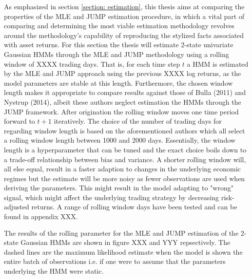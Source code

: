 As emphasized in section \ref{section: estimation}, this thesis aims at comparing the properties of the MLE and JUMP estimation procedure, in which a vital part of comparing and determining the most viable estimation methodology revolves around the methodology's capability of reproducing the stylized facts associated with asset returns. For this section the thesis will estimate 2-state univariate Gaussian HMMs through the MLE and JUMP methodology using a rolling window of XXXX trading days. That is, for each time step $t$ a HMM is estimated by the MLE and JUMP approach using the previous XXXX log returns, as the model parameters are stable at this length. Furthermore, the chosen window length makes it appropriate to compare results against those of Bulla (2011) and Nystrup (2014), albeit these authors neglect estimation the HMMs through the JUMP framework. After origination the rolling window moves one time period forward to $t+1$ iteratively. The choice of the number of trading days for regarding window length is based on the aforementioned authors which all select a rolling window length between 1000 and 2000 days. Essentially, the window length is a hyperparameter that can be tuned and the exact choice boils down to a trade-off relationship between bias and variance. A shorter rolling window will, all else equal, result in a faster adaption to changes in the underlying economic regimes but the estimate will be more noisy as fewer observations are used when deriving the parameters. This might result in the model adapting to "wrong" signal, which might affect the underlying trading strategy by decreasing risk-adjusted returns. A range of rolling window days have been tested and can be found in appendix XXX.

The results of the rolling parameter for the MLE and JUMP estimation of the 2-state Gaussian HMMs are shown in figure XXX and YYY repsectively. The dashed lines are the maximum likelihood estimate when the model is shown the entire batch of observations i.e. if one were to assume that the parameters underlying the HMM were static. 

